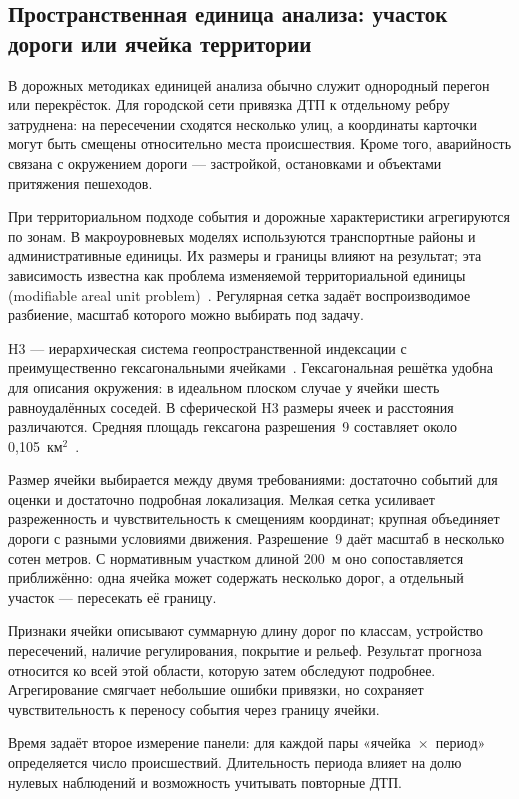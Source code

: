 \documentclass[coursework]{SCWorks}
\begin{document}
\subsection{Пространственная единица анализа: участок дороги или ячейка территории}

В дорожных методиках единицей анализа обычно служит однородный
перегон или перекрёсток. Для городской сети привязка ДТП к отдельному
ребру затруднена: на пересечении сходятся несколько улиц, а координаты
карточки могут быть смещены относительно места происшествия.
Кроме того, аварийность связана с окружением дороги --- застройкой,
остановками и объектами притяжения пешеходов.

При территориальном подходе события и дорожные характеристики
агрегируются по зонам. В макроуровневых моделях используются
транспортные районы и административные единицы. Их размеры и границы
влияют на результат; эта зависимость известна как проблема изменяемой
территориальной единицы (modifiable areal unit problem)~\cite{openshaw1984}.
Регулярная сетка задаёт воспроизводимое разбиение, масштаб которого
можно выбирать под задачу.

H3 --- иерархическая система геопространственной индексации
с преимущественно гексагональными ячейками~\cite{h3}. Гексагональная решётка удобна для описания
окружения: в идеальном плоском случае у ячейки шесть равноудалённых
соседей. В сферической H3 размеры ячеек и расстояния
различаются. Средняя площадь гексагона разрешения~9 составляет
около 0{,}105~км$^2$~\cite{h3stats}.

Размер ячейки выбирается между двумя требованиями: достаточно
событий для оценки и достаточно подробная локализация. Мелкая сетка
усиливает разреженность и чувствительность к смещениям координат;
крупная объединяет дороги с разными условиями движения. Разрешение~9
даёт масштаб в несколько сотен метров. С нормативным участком
длиной 200~м оно сопоставляется приближённо: одна ячейка может
содержать несколько дорог, а отдельный участок --- пересекать её границу.

Признаки ячейки описывают суммарную длину дорог по классам, устройство
пересечений, наличие регулирования, покрытие и рельеф. Результат
прогноза относится ко всей этой области, которую затем обследуют
подробнее. Агрегирование смягчает небольшие ошибки привязки,
но сохраняет чувствительность к переносу события через границу ячейки.

Время задаёт второе измерение панели: для каждой пары
«ячейка~$\times$~период» определяется число происшествий. Длительность
периода влияет на долю нулевых наблюдений и возможность учитывать
повторные ДТП.
\end{document}
